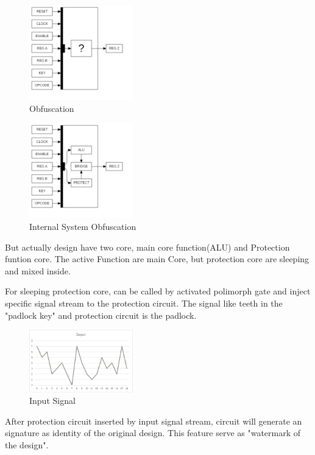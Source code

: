\documentclass[10pt,journal,compsoc,letterpaper,final]{IEEEtran}
\begin{document}
\begin{figure}
	\centering
	\includegraphics[width=0.4\textwidth]
	{images/topAsk.png}
	\caption{Obfuscation}
	\label{obf}
\end{figure}
\begin{figure}
	\centering
	\includegraphics[width=0.4\textwidth]
	{images/top.png}
	\caption{Internal System Obfuscation}
	\label{iobf}
\end{figure}

But actually design have two core, main core function(ALU) and Protection funtion core. The active Function are main Core, but protection core are sleeping and mixed inside.

For sleeping protection core, can be called by activated polimorph gate and inject specific signal stream to the protection circuit. The signal like teeth in the "padlock key" and protection circuit is the padlock. 

\begin{figure}
	\centering
	\includegraphics[width=0.4\textwidth]
	{images/1.png}
	\caption{Input Signal}
	\label{insig}
\end{figure}

After protection circuit inserted by input signal stream, circuit will generate an signature as identity of the original design. This feature serve as "watermark of the design".
\end{document}
